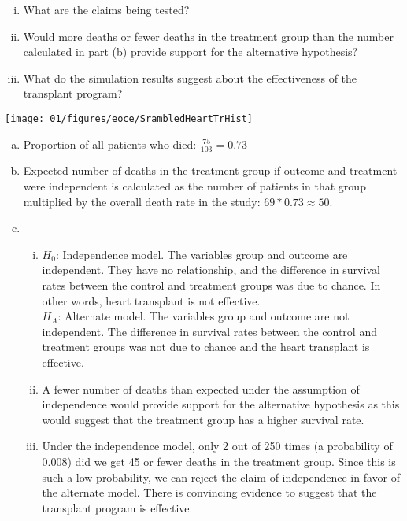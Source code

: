 {{\begin{enumerate}[(a)]
\begin{minipage}[c]{0.4\textwidth}
\begin{enumerate}[i.]
\setlength{\itemsep}{0mm}
\item What are the claims being tested?
\item Would more deaths or fewer deaths in the treatment group than the number calculated in part (b) provide support for the alternative hypothesis?
\item What do the simulation results suggest about the effectiveness of the transplant program?
\end{enumerate}
\end{minipage}
\begin{minipage}[c]{0.55\textwidth}
\begin{center}
\texttt{[image: 01/figures/eoce/SrambledHeartTrHist]}
\end{center}
\end{minipage}
\end{enumerate}
}
{
\begin{enumerate}[(a)]
\item Proportion of all patients who died: $\frac{75}{103} = 0.73$
\item Expected number of deaths in the treatment group if outcome and treatment were independent is calculated as the number of patients in that group multiplied by the overall death rate in the study: $69 * 0.73 \approx 50$.
\item 
\begin{enumerate}[i.]
\item $H_0$: Independence model. The variables group and outcome are independent. They have no relationship, and the difference in survival rates between the control and treatment groups was due to chance. In other words, heart transplant is not effective. \\
$H_A$: Alternate model. The variables group and outcome are not independent. The difference in survival rates between the control and treatment groups was not due to chance and the heart transplant is effective.
\item A fewer number of deaths than expected under the assumption of independence would provide support for the alternative hypothesis as this would suggest that the treatment group has a higher survival rate.
\item Under the independence model, only 2 out of 250 times (a probability of 0.008) did we get 45 or fewer deaths in the treatment group. Since this is such a low probability, we can reject the claim of independence in favor of the alternate model. There is convincing evidence to suggest that the transplant program is effective.
\end{enumerate}
\end{enumerate}
}
}

